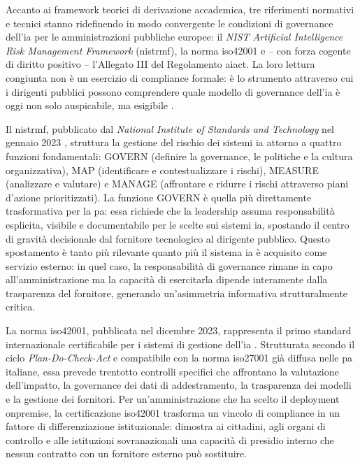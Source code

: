 Accanto ai framework teorici di derivazione accademica, tre riferimenti normativi e tecnici stanno ridefinendo in modo convergente le condizioni di governance dell'\gls{ia} per le amministrazioni pubbliche europee: il \textit{NIST Artificial Intelligence Risk Management Framework} (\gls{nistrmf}), la norma \gls{iso42001} e -- con forza cogente di diritto positivo -- l'Allegato III del Regolamento \gls{aiact}. La loro lettura congiunta non è un esercizio di compliance formale: è lo strumento attraverso cui i dirigenti pubblici possono comprendere quale modello di governance dell'\gls{ia} è oggi non solo auspicabile, ma esigibile \parencite{Wirtz2020}.

Il \gls{nistrmf}, pubblicato dal \textit{National Institute of Standards and Technology} nel gennaio 2023 \parencite{NIST_AI_RMF}, struttura la gestione del rischio dei sistemi \gls{ia} attorno a quattro funzioni fondamentali: GOVERN (definire la governance, le politiche e la cultura organizzativa), MAP (identificare e contestualizzare i rischi), MEASURE (analizzare e valutare) e MANAGE (affrontare e ridurre i rischi attraverso piani d'azione prioritizzati). La funzione GOVERN è quella più direttamente trasformativa per la \gls{pa}: essa richiede che la leadership assuma responsabilità esplicita, visibile e documentabile per le scelte sui sistemi \gls{ia}, spostando il centro di gravità decisionale dal fornitore tecnologico al dirigente pubblico. Questo spostamento è tanto più rilevante quanto più il sistema \gls{ia} è acquisito come servizio esterno: in quel caso, la responsabilità di governance rimane in capo all'amministrazione ma la capacità di esercitarla dipende interamente dalla trasparenza del fornitore, generando un'asimmetria informativa strutturalmente critica.

La norma \gls{iso42001}, pubblicata nel dicembre 2023, rappresenta il primo standard internazionale certificabile per i sistemi di gestione dell'\gls{ia} \parencite{ISO42001}. Strutturata secondo il ciclo \textit{Plan-Do-Check-Act} e compatibile con la norma \gls{iso27001} già diffusa nelle \gls{pa} italiane, essa prevede trentotto controlli specifici che affrontano la valutazione dell'impatto, la governance dei dati di addestramento, la trasparenza dei modelli e la gestione dei fornitori. Per un'amministrazione che ha scelto il deployment \gls{onpremise}, la certificazione \gls{iso42001} trasforma un vincolo di compliance in un fattore di differenziazione istituzionale: dimostra ai cittadini, agli organi di controllo e alle istituzioni sovranazionali una capacità di presidio interno che nessun contratto con un fornitore esterno può sostituire.

